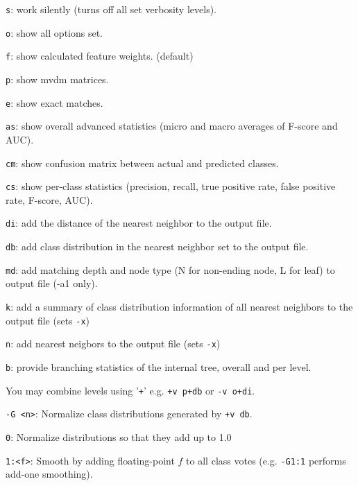 \documentclass{report}
\begin{document}
\begin{description}
	\begin{description}
         \item {\tt s}:  work silently (turns off all set verbosity levels).
         \item {\tt o}:  show all options set.
         \item {\tt f}:  show calculated feature weights. (default)
         \item {\tt p}:  show {\sc mvdm} matrices.
         \item {\tt e}:  show exact matches.
         \item {\tt as}: show overall advanced statistics (micro and macro averages of F-score and AUC).
	 \item {\tt cm}: show confusion matrix between actual and predicted classes.
         \item {\tt cs}: show per-class statistics (precision, recall, true positive rate, false positive rate, F-score, AUC).
         \item {\tt di}: add the distance of the nearest neighbor to the output file.
         \item {\tt db}: add class distribution in the nearest neighbor set to the output file.
         \item {\tt md}: add matching depth and node type (N for non-ending
           node, L for leaf) to output file (-a1 only).
	 \item {\tt k}:  add a summary of class distribution information of all nearest neighbors to the output file (sets {\tt -x})
         \item {\tt n}:  add nearest neigbors to the output file (sets {\tt -x})
         \item {\tt b}:  provide branching statistics of the internal tree, overall and per level.
	\end{description}

        You may combine levels using '{\tt +}' e.g. {\tt +v p+db} or
        {\tt -v o+di}.

\item {\tt -G <n>}: Normalize class distributions generated by {\tt +v db}.
  \begin{description}
    \item {\tt 0}: Normalize distributions so that they add up to 1.0
    \item {\tt 1:<f>}: Smooth by adding floating-point $f$ to all class votes (e.g. {\tt -G1:1} performs add-one smoothing).
  \end{description}


\end{description}
\end{document}
